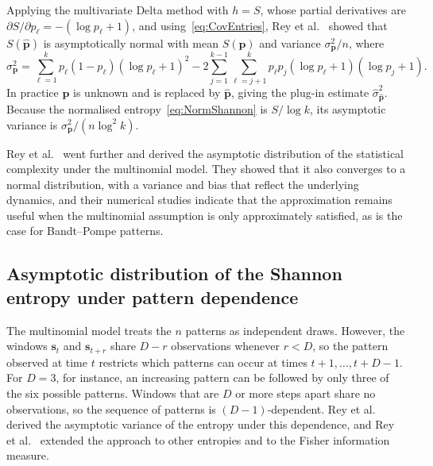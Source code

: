 Applying the multivariate Delta method with $h=S$, whose partial derivatives are $\partial S/\partial p_\ell=-(\log p_\ell+1)$, and using~\eqref{eq:CovEntries}, Rey et al.~\cite{Rey2023,Rey2025} showed that $S(\widehat{\mathbf{p}})$ is asymptotically normal with mean $S(\mathbf{p})$ and variance $\sigma^2_{\mathbf{p}}/n$, where
\begin{equation}
	\sigma^2_{\mathbf{p}}=\sum_{\ell=1}^{k}p_\ell(1-p_\ell)(\log p_\ell+1)^2-2\sum_{j=1}^{k-1}\sum_{\ell=j+1}^{k}p_\ell p_j(\log p_\ell+1)(\log p_j+1).
	\label{eq:SigmaMultinomial}
\end{equation}
In practice $\mathbf{p}$ is unknown and is replaced by $\widehat{\mathbf{p}}$, giving the plug-in estimate $\widehat{\sigma}^2_{\widehat{\mathbf{p}}}$. Because the normalised entropy~\eqref{eq:NormShannon} is $S/\log k$, its asymptotic variance is $\sigma^2_{\mathbf{p}}/(n\log^2 k)$.

Rey et al.~\cite{Rey2025} went further and derived the asymptotic distribution of the statistical complexity under the multinomial model. They showed that it also converges to a normal distribution, with a variance and bias that reflect the underlying dynamics, and their numerical studies indicate that the approximation remains useful when the multinomial assumption is only approximately satisfied, as is the case for Bandt--Pompe patterns.

\subsection{Asymptotic distribution of the Shannon entropy under pattern dependence}\label{Subsec:PatternDependence}

The multinomial model treats the $n$ patterns as independent draws. However, the windows $\mathbf{s}_t$ and $\mathbf{s}_{t+r}$ share $D-r$ observations whenever $r<D$, so the pattern observed at time $t$ restricts which patterns can occur at times $t+1,\dots,t+D-1$. For $D=3$, for instance, an increasing pattern can be followed by only three of the six possible patterns. Windows that are $D$ or more steps apart share no observations, so the sequence of patterns is $(D-1)$-dependent. Rey et al.~\cite{Rey2023a} derived the asymptotic variance of the entropy under this dependence, and Rey et al.~\cite{Rey2024} extended the approach to other entropies and to the Fisher information measure.

